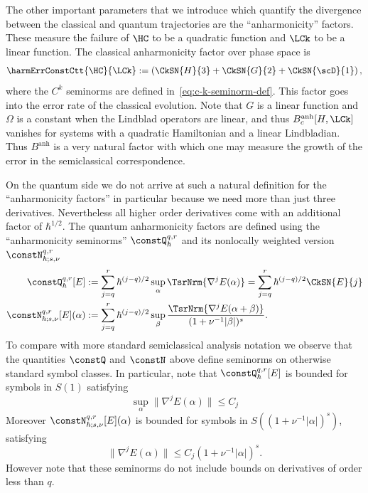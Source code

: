 \documentclass{article}
\numberwithin{equation}{section}
\begin{document}
The other important parameters that we introduce which quantify the divergence between the classical and quantum trajectories are the ``anharmonicity'' factors.  These measure the failure of $\HC$ to be a quadratic function and $\LCk$ to be a linear function.
The classical anharmonicity factor over phase space is
\begin{align} \label{eq:harmErrConstCtt-def}
	\harmErrConstCtt{\HC}{\LCk} := \left(\CkSN{H}{3} + 
     \CkSN{G}{2} + \CkSN{\scD}{1} \right),
\end{align}
where the $C^k$ seminorms are defined 
in~\eqref{eq:c-k-seminorm-def}.  
This factor goes into the error rate of the classical evolution. 
Note that $G$ is a linear function and $\Omega$ is a constant when the Lindblad operators are linear, and thus $B^{\text{anh}}_c[H,\LCk]$ vanishes for systems with a quadratic Hamiltonian and a linear Lindbladian.  Thus $B^{\text{anh}}$ is a very natural factor with which one may measure the growth of the error in the semiclassical correspondence.

On the quantum side we do not arrive at such a natural definition for the ``anharmonicity factors'' in particular because we need more than just three derivatives.  Nevertheless all higher order derivatives come with an additional factor of $\hbar^{1/2}$.
The quantum anharmonicity factors are defined
using the ``anharmonicity seminorms'' $\constQ^{q,r}_\hbar$ and 
its nonlocally weighted version $\constN^{q,r}_{\hbar;s,\nu}$
\begin{align}
\label{eq:constQ-def}
\constQ^{q,r}_{\hbar}[E]
&:= \sum_{j=q}^r \hbar^{(j-q)/2}\sup_\alpha \TsrNrm{\nabla^jE(\alpha)}
= \sum_{j=q}^r \hbar^{(j-q)/2}\CkSN{E}{j} \\
\label{eq:constN-def}
\constN^{q,r}_{\hbar;s,\nu}[E](\alpha)
&:= 
\sum_{j=q}^r \hbar^{(j-q)/2} 
\sup_\beta 
\frac{\TsrNrm{\nabla^jE(\alpha+\beta)}}{(1+\nu^{-1}|\beta|)^s}.
\end{align}
To compare with more standard semiclassical analysis notation we observe that the quantities $\constQ$ and $\constN$ above 
define seminorms on otherwise standard symbol classes.  In particular, note that $\constQ^{q,r}_\hbar[E]$ is bounded
for symbols in $S(1)$  satisfying
\[
\sup_\alpha\|\nabla^j E(\alpha)\| \leq C_j 
\]
Moreover $\constN^{q,r}_{\hbar;s,\nu}[E](\alpha)$
is bounded for symbols in $S((1+\nu^{-1}|\alpha|)^s)$, satisfying
\begin{equation}
\label{eq:stupid-S-def}
\|\nabla^j E(\alpha)\|
\leq C_j (1+\nu^{-1}|\alpha|)^s.
\end{equation}
However note that these seminorms do not include bounds on derivatives of order less than $q$.
\end{document}
